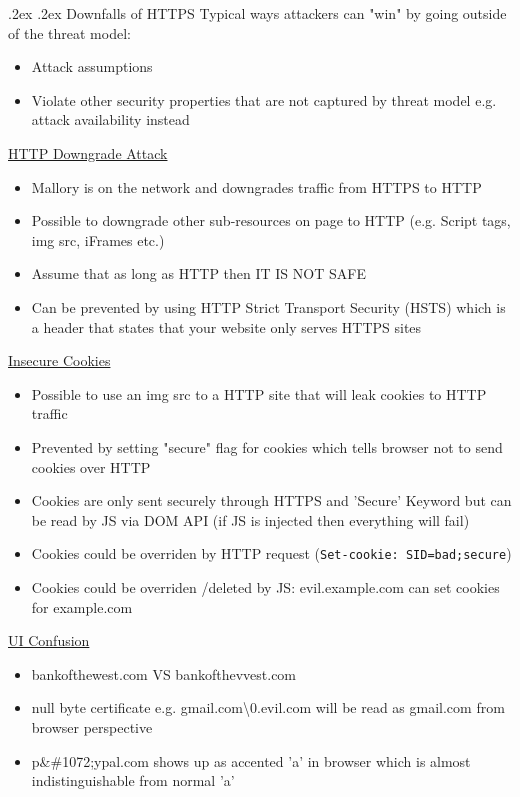 \documentclass[10pt,landscape,a4paper]{article}
\makeatletter
\renewcommand{\subsubsection}{\@startsection{subsubsection}{1}{0mm}%
	{.2ex}%
	{.2ex}%
	{\rmfamily\bfseries}}
\makeatother
\begin{document}
\begin{multicols*}{4}
\subsubsection{Downfalls of HTTPS}
Typical ways attackers can "win" by going outside of the threat model:
\begin{itemize}
	\item Attack assumptions
	\item Violate other security properties that are not captured by threat model e.g. attack availability instead
\end{itemize}
\underline{HTTP Downgrade Attack}
\begin{itemize}
	\item Mallory is on the network and downgrades traffic from HTTPS to HTTP
	\item Possible to downgrade other sub-resources on page to HTTP (e.g. Script tags, img src, iFrames etc.)
	\item Assume that as long as HTTP then IT IS NOT SAFE
	\item Can be prevented by using HTTP Strict Transport Security (HSTS) which is a header that states that your website only serves HTTPS sites
\end{itemize}
\underline{Insecure Cookies}
\begin{itemize}
	\item Possible to use an img src to a HTTP site that will leak cookies to HTTP traffic
	\item Prevented by setting "secure" flag for cookies which tells browser not to send cookies over HTTP
	\item Cookies are only sent securely through HTTPS and 'Secure' Keyword but can be read by JS via DOM API (if JS is injected then everything will fail)
	\item Cookies could be overriden by HTTP request (\texttt{Set-cookie: SID=bad;secure}) 
	\item Cookies could be overriden /deleted by JS: evil.example.com can set cookies for example.com
\end{itemize}
\underline{UI Confusion}
\begin{itemize}
	\item bankofthewest.com VS bankofthevvest.com
	\item null byte certificate e.g. gmail.com\textbackslash0.evil.com will be read as gmail.com from browser perspective
	\item p\&\#1072;ypal.com shows up as accented 'a' in browser which is almost indistinguishable from normal 'a'

\end{itemize}
\end{multicols*}
\end{document}

